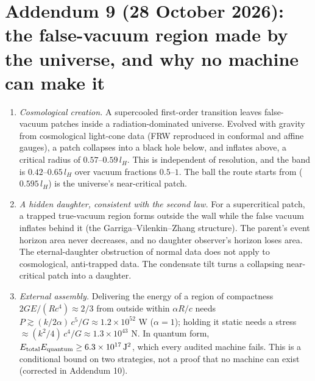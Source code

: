 \documentclass[11pt,a4paper]{article}
\theoremstyle{remark}\newtheorem{remark}[theorem]{Remark}
\begin{document}
\section*{Addendum 9 (28 October 2026): the false-vacuum region made by the universe, and why no machine can make it}
\begin{enumerate}
\item \emph{Cosmological creation.} A supercooled first-order transition leaves false-vacuum patches inside a radiation-dominated universe. Evolved
with gravity from cosmological light-cone data (FRW reproduced in conformal and affine gauges), a patch collapses into a black hole below, and
inflates above, a critical radius of $0.57$--$0.59\,l_H$. This is independent of resolution, and the band is $0.42$--$0.65\,l_H$ over vacuum
fractions $0.5$--$1$. The ball the route starts from ($0.595\,l_H$) is the universe's near-critical patch.
\item \emph{A hidden daughter, consistent with the second law.} For a supercritical patch, a trapped true-vacuum region forms outside the wall while the
false vacuum inflates behind it (the Garriga--Vilenkin--Zhang structure). The parent's event horizon area never decreases, and no daughter observer's
horizon loses area. The eternal-daughter obstruction of normal data does not apply to cosmological, anti-trapped data. The condensate tilt turns a
collapsing near-critical patch into a daughter.
\item \emph{External assembly.} Delivering the energy of a region of compactness $2GE/(Rc^4)\approx2/3$ from outside within $\alpha R/c$ needs
$P\gtrsim(k/2\alpha)\,c^5/G\approx1.2\times10^{52}$ W ($\alpha=1$); holding it static needs a stress $\approx(k^2/4)\,c^4/G\approx1.3\times10^{43}$ N. In quantum form,
$E_{\rm total}E_{\rm quantum}\ge6.3\times10^{17}\,{\rm J^2}$, which every audited machine fails. This is a conditional bound on two strategies, not a proof that
no machine can exist (corrected in Addendum 10).
\end{enumerate}
\end{document}
